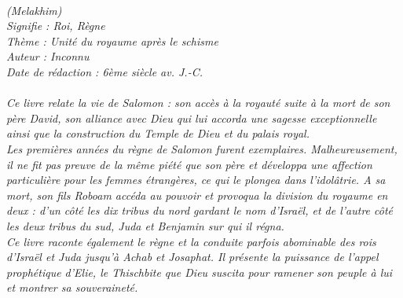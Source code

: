 \BFont
\noindent\hrulefill
{\footnotesize
\textit{
\bigskip
{\centering{}
\\(Melakhim)
\\Signifie : Roi, Règne
\\Thème : Unité du royaume après le schisme
\\Auteur : Inconnu
\\Date de rédaction : 6ème siècle av. J.-C.\\}
}
\textit{
\\Ce livre relate la vie de Salomon : son accès à la royauté suite à la mort de son père David, son alliance avec Dieu qui lui accorda une sagesse exceptionnelle ainsi que la construction du Temple de Dieu et du palais royal.
\\Les premières années du règne de Salomon furent exemplaires. Malheureusement, il ne fit pas preuve de la même piété que son père et développa une affection particulière pour les femmes étrangères, ce qui le plongea dans l’idolâtrie. A sa mort, son fils Roboam accéda au pouvoir et provoqua la division du royaume en deux : d’un côté les dix tribus du nord gardant le nom d’Israël, et de l’autre côté les deux tribus du sud, Juda et Benjamin sur qui il régna.
\\Ce livre raconte également le règne et la conduite parfois abominable des rois d’Israël et Juda jusqu’à Achab et Josaphat. Il présente la puissance de l’appel prophétique d’Elie, le Thischbite que Dieu suscita pour ramener son peuple à lui et montrer sa souveraineté.\bigskip
}
}
\par\nobreak\noindent\hrulefill
